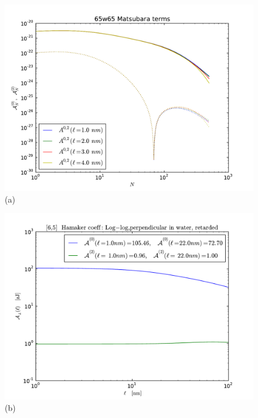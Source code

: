 \documentclass[onecolumn,letterpaper,amsmath,amssymb,floatfix,aps,superscriptaddress]{revtex4}
\begin{document}
\begin{figure}[t!]
\begin{center}
\begin{minipage}[b]{0.40\textwidth}
\begin{center}
\includegraphics[width=1.2\textwidth]{plots/65_A_vs_n.pdf} (a)
\end{center}
\end{minipage}
\hskip 43pt
\begin{minipage}[b]{0.40\textwidth}
\begin{center}
\includegraphics[width=1.2\textwidth]{plots/140322_65w65_HCs_perpendicular_ret.pdf} (b)
\end{center}
\end{minipage}

\end{center}
\end{figure}
\end{document}
